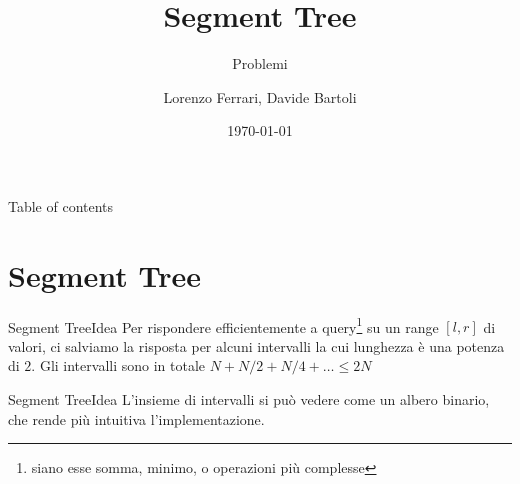 \documentclass[compress]{beamer}
\title{Segment Tree}
\subtitle{Problemi}
\author{Lorenzo Ferrari, Davide Bartoli}
\date{\today}
\begin{document}
\begin{frame}
    \maketitle
\end{frame}

\begin{frame}{Table of contents}
  \tableofcontents
\end{frame}

\section{Segment Tree}
\begin{frame}{Segment Tree}{Idea}
    Per rispondere efficientemente a query\footnote{siano esse somma, minimo, o operazioni pi\`u complesse} su un range $[l, r]$ di valori, ci salviamo la risposta per alcuni intervalli la cui lunghezza \`e una potenza di $2$.
    \vfill
    \vfill
    \pause
    Gli intervalli sono in totale $N + N/2 + N/4 + \dots \leq 2N$
\end{frame}

\begin{frame}{Segment Tree}{Idea}
    L'insieme di intervalli si pu\`o vedere come un albero binario, che rende pi\`u intuitiva l'implementazione.\\ 
    \vfill
\end{frame}
\end{document}
